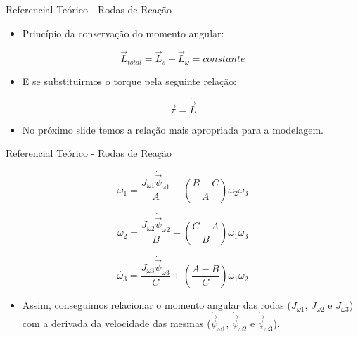 \documentclass{beamer}
\begin{document}

\begin{frame}{Referencial Teórico - Rodas de Reação}
	\begin{itemize}
		\justifying
		\item Princípio da conservação do momento angular:
    \end{itemize}

	\begin{equation}\label{eq:ltot}
		\vec{L}_{total}=\vec{L}_s+\vec{L}_{\omega}=constante 
	\end{equation}

		\begin{itemize}
		\justifying
		\item E se substituirmos o torque pela seguinte relação:
    \end{itemize}
       \begin{equation}
		\vec{\tau}=\dot{\vec{L}}
	\end{equation}

	\begin{itemize}
		\justifying
		\item No próximo slide temos a relação mais apropriada para a modelagem.
    \end{itemize}
\end{frame}


\begin{frame}{Referencial Teórico - Rodas de Reação}

	\begin{equation}\label{eq:modeloA}
	  \dot{\omega_{1}}=\frac{J_{\omega 1}\dot{\vec{\psi}}_{\omega 1}}{A}+\left(\frac{B-C}{A}\right)\omega_{2}\omega_{3}
	\end{equation}

	\begin{equation}\label{eq:modeloB}
	  \dot{\omega_{2}}=\frac{J_{\omega 2}\dot{\vec{\psi}}_{\omega 2}}{B}+\left(\frac{C-A}{B}\right)\omega_{1}\omega_{3}
	\end{equation}

	\begin{equation}\label{eq:modeloC}
	  \dot{\omega_{3}}=\frac{J_{\omega 3}\dot{\vec{\psi}}_{\omega 3}}{C}+\left(\frac{A-B}{C}\right)\omega_{1}\omega_{2}
	\end{equation}

	\begin{itemize}
		\justifying
		\item Assim, conseguimos relacionar o momento angular das rodas ($J_{\omega 1}$, $J_{\omega 2}$ e $J_{\omega 3}$) com a derivada da velocidade das mesmas ($\dot{\vec{\psi}}_{\omega 1}$, $\dot{\vec{\psi}}_{\omega 2}$ e $\dot{\vec{\psi}}_{\omega 3}$).
    \end{itemize}

\end{frame}
\end{document}
